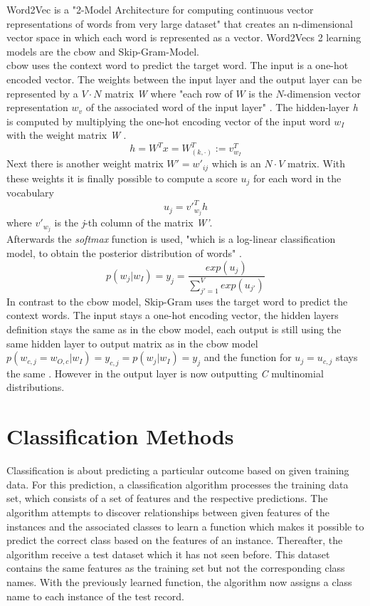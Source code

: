 \documentclass[a4paper, 11pt,titlepage,oneside,openany]{book}
\begin{document}
Word2Vec is a "2-Model Architecture for computing continuous vector representations of words from very large dataset"\cite{effiecientestimation} that creates an n-dimensional vector space in which each word is represented as a vector. Word2Vecs 2 learning models are the \gls{cbow} and Skip-Gram-Model.\\
\noindent \gls{cbow} uses the context word to predict the target word. The input is a one-hot encoded vector. The weights between the input layer and the output layer can be represented by a $V \cdot N$ matrix \textit{W} where "each row of $W$ is the $N$-dimension vector representation $w_v$ of the associated word of the input layer" \cite{word2vecparam}. The hidden-layer \textit{h} is computed by multiplying the one-hot encoding vector of the input word $w_I$ with the weight matrix \textit{W} \cite{word2vecparam}.
\[
h=W^Tx=W_{(k, \cdot)}^{T}:=v_{w_I}^{T}
\] 
Next there is another weight matrix $W'={w'_{ij}}$ which is an $N \cdot V$ matrix. With these weights it is finally possible to compute a score $u_j$ for each word in the vocabulary \cite{word2vecparam}
\[
u_{j}={v'}_{w_j}^{T}h
\] where ${v'}_{w_j}$ is the \textit{j}-th column of the matrix \textit{W'}. \\
\newpage
\noindent Afterwards the \textit{softmax} function is used, "which is a log-linear classification model, to obtain the posterior distribution of words" \cite{word2vecparam}.
\[
p(w_j|w_I)=y_j=\frac{exp(u_j)}{\sum_{j'=1}^V exp(u_{j'})}
\] 
\indent In contrast to the \gls{cbow} model,  Skip-Gram uses the target word to predict the context words. The input stays a one-hot encoding vector, the hidden layers definition stays the same as in the \gls{cbow} model, each output is still using the same hidden layer to output matrix as in the \gls{cbow} model $p(w_{c,j}=w_{O,c}|w_I)=y_{c,j} = p(w_j|w_I)=y_j$ and the function for $u_j=u_{c,j}$ stays the same \cite{word2vecparam}. However in the output layer is now outputting \textit{C} multinomial distributions.  

\section{Classification Methods}
Classification is about predicting a particular outcome based on given training data. For this prediction, a classification algorithm processes the training data set, which consists of a set of features and the respective predictions. The algorithm attempts to discover relationships between given features  of the instances and the associated classes to learn a function which makes it possible to predict the correct class based on the features of an instance. Thereafter, the algorithm receive a test dataset which it has not seen before. This dataset contains the same features as the training set but not the corresponding class names. With the previously learned function, the algorithm now assigns a class name to each instance  of the test record. \\
\end{document}

